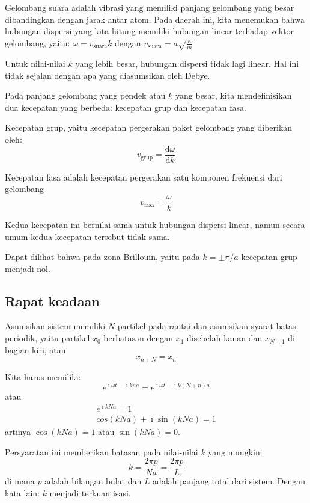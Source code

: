 Gelombang suara adalah vibrasi yang memiliki panjang gelombang yang
besar dibandingkan dengan jarak antar atom. Pada daerah ini, kita
menemukan bahwa hubungan dispersi yang kita hitung memiliki hubungan
linear terhadap vektor gelombang, yaitu:
$\omega = v_{\mathrm{suara}} k$ dengan
$v_{\mathrm{suara}} = a\sqrt{\frac{\kappa}{m}}$

Untuk nilai-nilai $k$ yang lebih besar, hubungan dispersi tidak lagi
linear. Hal ini tidak sejalan dengan apa yang diasumsikan oleh Debye.

Pada panjang gelombang yang pendek atau $k$ yang besar, kita
mendefinisikan dua kecepatan yang berbeda: kecepatan grup dan kecepatan
fasa.

Kecepatan grup, yaitu kecepatan pergerakan paket gelombang yang
diberikan oleh:
\begin{equation}
v_{\mathrm{grup}} = \frac{\mathrm{d}\omega}{\mathrm{d}k}
\end{equation}

Kecepatan fasa adalah kecepatan pergerakan satu komponen frekuensi dari
gelombang
\begin{equation}
v_{\mathrm{fasa}} = \frac{\omega}{k}  
\end{equation}

Kedua kecepatan ini bernilai sama untuk hubungan dispersi linear, namun
secara umum kedua kecepatan tersebut tidak sama.

Dapat dilihat bahwa pada zona Brillouin, yaitu pada $k = \pm \pi/a$
kecepatan grup menjadi nol.


\subsection{Rapat keadaan}
Asumsikan sistem memiliki $N$ partikel pada rantai dan asumsikan
syarat batas periodik, yaitu partikel \(x_{0}\) berbatasan dengan
\(x_{1}\) disebelah kanan dan \(x_{N-1}\) di bagian kiri, atau \[
x_{n+N} = x_{n}
\]

Kita harus memiliki:
\begin{equation}
e^{\imath \omega t - \imath k n a} =
e^{\imath \omega t - \imath k (N+n) a}
\end{equation}
atau
\begin{align*}
e^{\imath k N a} = 1 \\
cos(kNa) + \imath \sin(kNa) = 1
\end{align*}
artinya $\cos(kNa) = 1$ atau $\sin(kNa) = 0$.

Persyaratan ini memberikan batasan pada nilai-nilai $k$ yang mungkin:
\begin{equation}
k = \frac{2\pi p}{Na} = \frac{2\pi p}{L}  
\end{equation}
di mana $p$ adalah bilangan bulat dan $L$ adalah panjang total
dari sistem.
Dengan kata lain: $k$ menjadi terkuantisasi.

